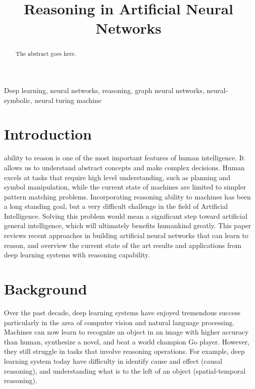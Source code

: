\documentclass[journal]{IEEEtran}
\begin{document}
\title{Reasoning in Artificial Neural Networks}

\author{%
}

\maketitle


\begin{abstract}
The abstract goes here.
\end{abstract}


\begin{IEEEkeywords}
Deep learning, neural networks, reasoning, graph neural networks, neural-symbolic, neural turing machine
\end{IEEEkeywords}



\section{Introduction}

 ability to reason is one of the most important features of human intelligence. 
It allows us to understand abstract concepts and make complex decisions.
Human excels at tasks that require high level understanding, such as planning and symbol manipulation, 
while the current state of machines are limited to simpler pattern matching problems.
Incorporating reasoning ability to machines has been a long standing goal, but a very difficult challenge in the field of Artificial Intelligence. 
Solving this problem would mean a significant step toward artificial general intelligence, which will ultimately benefits humankind greatly. 
This paper reviews recent approaches in building artificial neural networks that can learn to reason, 
and overview the current state of the art results and applications from deep learning systems with reasoning capability.

\section{Background}
Over the past decade, deep learning systems have enjoyed tremendous success particularly in the area of computer vision and natural language processing.
Machines can now learn to recognize an object in an image with higher accuracy than human, synthesize a novel, and beat a world champion Go player.
However, they still struggle in tasks that involve reasoning operations. For example, deep learning system today have difficulty in
identify cause and effect (causal reasoning), and understanding what is to the left of an object (spatial-temporal reasoning).
\end{document}
